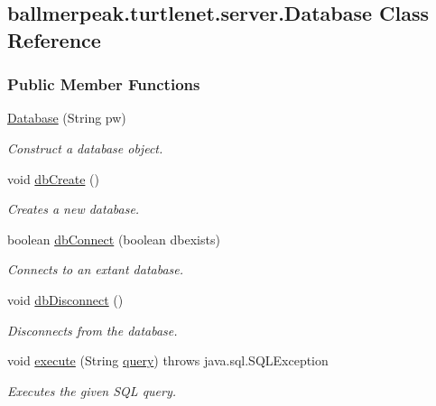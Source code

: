 \hypertarget{classballmerpeak_1_1turtlenet_1_1server_1_1Database}{\subsection{ballmerpeak.\-turtlenet.\-server.\-Database Class Reference}
\label{classballmerpeak_1_1turtlenet_1_1server_1_1Database}
}
\subsubsection*{Public Member Functions}
\begin{DoxyCompactItemize}
\item 
\hyperlink{classballmerpeak_1_1turtlenet_1_1server_1_1Database_a2df6c740699204eafab513d8990f14a8}{Database} (String pw)
\begin{DoxyCompactList}\small\item\em Construct a database object. \end{DoxyCompactList}\item 
void \hyperlink{classballmerpeak_1_1turtlenet_1_1server_1_1Database_af796c23330bbae7271011b0e81901643}{db\-Create} ()
\begin{DoxyCompactList}\small\item\em Creates a new database. \end{DoxyCompactList}\item 
boolean \hyperlink{classballmerpeak_1_1turtlenet_1_1server_1_1Database_a80e93295b9fd81f2a3c73bcaa2df39ee}{db\-Connect} (boolean dbexists)
\begin{DoxyCompactList}\small\item\em Connects to an extant database. \end{DoxyCompactList}\item 
void \hyperlink{classballmerpeak_1_1turtlenet_1_1server_1_1Database_a1900530bc7bf5c275a275b788086f6ec}{db\-Disconnect} ()
\begin{DoxyCompactList}\small\item\em Disconnects from the database. \end{DoxyCompactList}\item 
void \hyperlink{classballmerpeak_1_1turtlenet_1_1server_1_1Database_a717872aaaaf6529490c31465f2952219}{execute} (String \hyperlink{classballmerpeak_1_1turtlenet_1_1server_1_1Database_a4401c37a89ca60d2e6b926b9930446dc}{query})  throws java.\-sql.\-S\-Q\-L\-Exception 
\begin{DoxyCompactList}\small\item\em Executes the given S\-Q\-L query. \end{DoxyCompactList}\item 

\end{DoxyCompactItemize}
